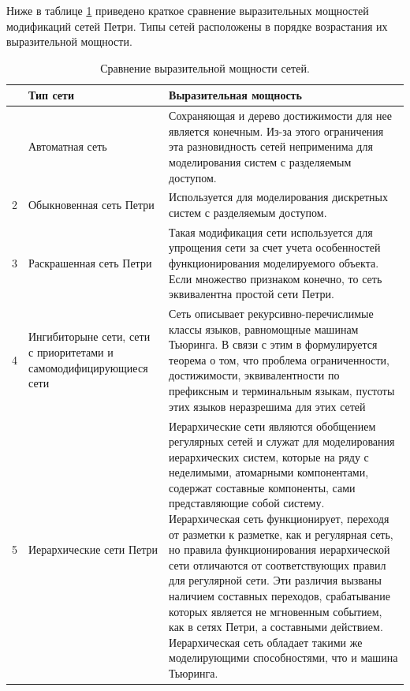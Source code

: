 Ниже в таблице \ref{tab:petri} приведено краткое сравнение выразительных мощностей модификаций сетей Петри. Типы сетей расположены в порядке возрастания их выразительной мощности.
\begin{center}
	\begin{longtable}{|p{}|p{}|p{}|}
		\caption{Сравнение выразительной мощности сетей.}
		\label{tab:petri}
		\\ \hline
		& Тип сети & Выразительная мощность
		\hline \endfirsthead
		\subcaption{Продолжение таблицы ~\ref{tab:petri}}
		\\ \hline \endhead
		\hline \subcaption{Продолжение на след. стр.}
		\endfoot
		\hline \endlastfoot
		1 & Автоматная сеть & Сохраняющая и дерево достижимости для нее является конечным. Из-за этого ограничения эта разновидность сетей неприменима для моделирования систем с разделяемым доступом. \\
		\hline
		2 & Обыкновенная сеть Петри & Используется для моделирования дискретных систем с разделяемым доступом. \\
		\hline
		3 & Раскрашенная сеть Петри & Такая модификация сети используется для упрощения сети за счет учета особенностей функционирования моделируемого объекта. Если множество признаком конечно, то сеть эквивалентна простой сети Петри. \\
		\hline
		4 & Ингибиторыне сети, сети с приоритетами и самомодифицирующиеся сети & Сеть описывает рекурсивно-перечислимые классы языков, равномощные машинам Тьюринга. В связи с этим в \cite{Piterson} формулируется теорема о том, что проблема ограниченности, достижимости, эквивалентности по префиксным и терминальным языкам, пустоты этих языков неразрешима для этих сетей \\
		\hline
		5 & Иерархические сети Петри & Иерархические сети являются обобщением регулярных сетей и служат для моделирования иерархических систем, которые на ряду с неделимыми, атомарными компонентами, содержат составные компоненты, сами представляющие собой систему. Иерархическая сеть функционирует, переходя от разметки к разметке, как и регулярная сеть, но правила функционирования иерархической сети отличаются от соответствующих правил для регулярной сети. Эти различия вызваны наличием составных переходов, срабатывание которых является не мгновенным событием, как в сетях Петри, а составными действием. \cite{Kotov} Иерархическая сеть обладает такими же моделирующими способностями, что и машина Тьюринга. \\
	\end{longtable}
\end{center}

